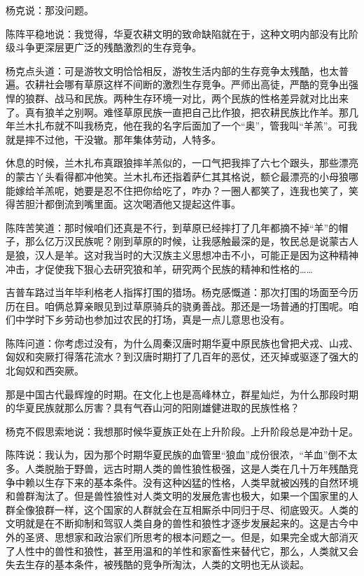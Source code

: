 \par 杨克说：那没问题。
\par 陈阵平稳地说：我觉得，华夏农耕文明的致命缺陷就在于，这种文明内部没有比阶级斗争更深层更广泛的残酷激烈的生存竞争。
\par 杨克点头道：可是游牧文明恰恰相反，游牧生活内部的生存竞争太残酷，也太普遍。农耕社会哪有草原这样不间断的激烈生存竞争。严师出高徒，严酷的竞争出强悍的狼群、战马和民族。两种生存环境一对比，两个民族的性格差异就对比出来了。真有狼羊之别啊。难怪草原民族一直把自己比作狼，把农耕民族比作羊。那几年兰木扎布就不叫我杨克，他在我的名字后面加了一个“奥”，管我叫“羊羔”。可我就是摔不过他，干没辙。那年集体劳动，人特多。
\par 休息的时候，兰木扎布真跟狼摔羊羔似的，一口气把我摔了六七个跟头，那些漂亮的蒙古丫头看得都冲他笑。兰木扎布还指着萨仁其其格说，额仑最漂亮的小母狼哪能嫁给羊羔呢，她要是忍不住把你给吃了，咋办？一圈人都笑了，连我也笑了，笑得苦胆汁都倒流到嘴里面。这次喝酒他又提起这件事。
\par 陈阵苦笑道：那时候咱们还真是不行，到草原已经摔打了几年都摘不掉“羊”的帽子，那么亿万汉民族呢？刚到草原的时候，让我感触最深的是，牧民总是说蒙古人是狼，汉人是羊。这对我当时的大汉族主义思想冲击不小，可能正是因为这种精神冲击，才促使我下狠心去研究狼和羊，研究两个民族的精神和性格的……
\par 吉普车路过当年毕利格老人指挥打围的猎场。杨克感慨道：那次打围的场面至今历历在目。咱俩总算亲眼见到过草原骑兵的骁勇善战。那还是一场普通的打围呢。咱们中学时下乡劳动也参加过农民的打场，真是一点儿意思也没有。
\par 陈阵问道：你考虑过没有，为什么周秦汉唐时期华夏中原民族也曾把犬戎、山戎、匈奴和突厥打得落花流水？到汉唐时期打了几百年的恶仗，还灭掉或驱逐了强大的北匈奴和西突厥。
\par 那是中国古代最辉煌的时期。在文化上也是高峰林立，群星灿烂，为什么那段时期的华夏民族就那么厉害？具有气吞山河的阳刚雄健进取的民族性格？
\par 杨克不假思索地说：我想那时候华夏族正处在上升阶段。上升阶段总是冲劲十足。
\par 陈阵说：我认为，因为那个时期华夏民族的血管里“狼血”成份很浓，“羊血”倒不太多。人类脱胎于野兽，远古时期人类的兽性狼性极强，这是人类在几十万年残酷竞争中赖以生存下来的基本条件。没有这种凶猛的性格，人类早就被凶残的自然环境和兽群淘汰了。但是兽性狼性对人类文明的发展危害也极大，如果一个国家里的人群全像狼群一样，这个国家的人群就会在互相厮杀中同归于尽、彻底毁灭。人类的文明就是在不断抑制和驾驭人类自身的兽性和狼性才逐步发展起来的。这是古今中外的圣贤、思想家和政治家们所思考的根本问题之一。但是，如果完全或大部消灭了人性中的兽性和狼性，甚至用温和的羊性和家畜性来替代它，那么，人类就又会失去生存的基本条件，被残酷的竞争所淘汰，人类的文明也无从谈起。
